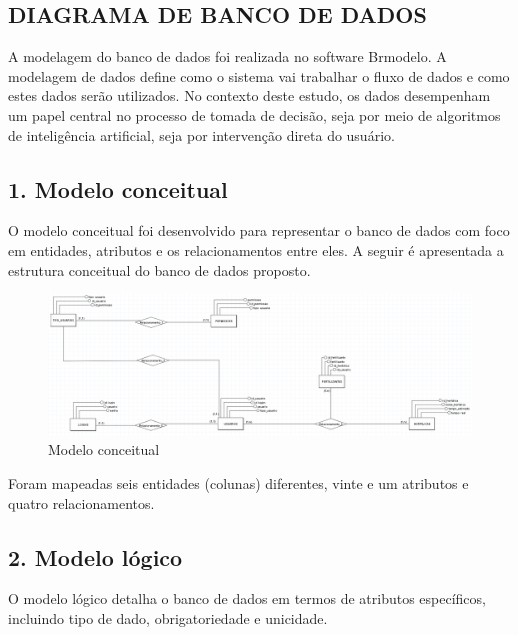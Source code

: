 \subsection*{DIAGRAMA DE BANCO DE DADOS}

A modelagem do banco de dados foi realizada no software Brmodelo. A modelagem de dados define como o sistema vai trabalhar o fluxo de dados e como estes dados serão utilizados. No contexto deste estudo, os dados desempenham um papel central no processo de tomada de decisão, seja por meio de algoritmos de inteligência artificial, seja por intervenção direta do usuário.

\subsection*{1. Modelo conceitual}

O modelo conceitual foi desenvolvido para representar o banco de dados com foco em entidades, atributos e os relacionamentos entre eles. A seguir é apresentada a estrutura conceitual do banco de dados proposto.

\clearpage
\begin{figure}[!h]
\centering
\caption{Modelo conceitual}
\label{fig:picture14}
\includegraphics[scale=0.4]{Illustrations/modelo conceitual.png}
\end{figure}

Foram mapeadas seis entidades (colunas) diferentes, vinte e um atributos e quatro relacionamentos.

\subsection*{2. Modelo lógico}

O modelo lógico detalha o banco de dados em termos de atributos específicos, incluindo tipo de dado, obrigatoriedade e unicidade. 

